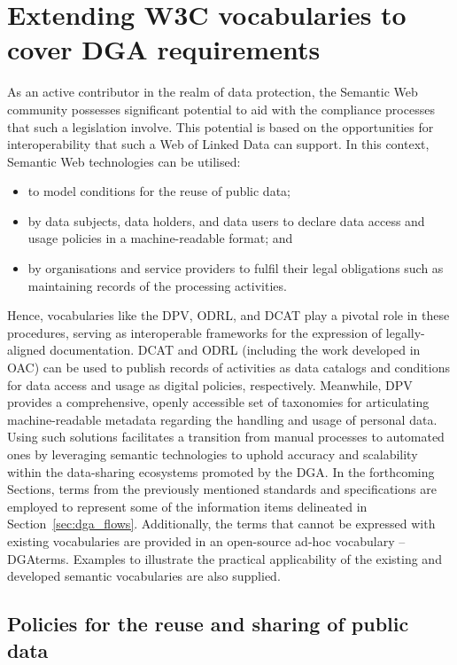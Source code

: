 \section{Extending W3C vocabularies to cover DGA requirements}
\label{sec:extending_dga}

As an active contributor in the realm of data protection, the Semantic Web community possesses significant potential to aid with the compliance processes that such a legislation involve.
This potential is based on the opportunities for interoperability that such a Web of Linked Data can support.
In this context, Semantic Web technologies can be utilised:

\begin{itemize}
    \item to model conditions for the reuse of public data;
    \item by data subjects, data holders, and data users to declare data access and usage policies in a machine-readable format; and
    \item by organisations and service providers to fulfil their legal obligations such as maintaining records of the processing activities.
\end{itemize}

Hence, vocabularies like the DPV, ODRL, and DCAT play a pivotal role in these procedures, serving as interoperable frameworks for the expression of legally-aligned documentation.
DCAT and ODRL (including the work developed in OAC) can be used to publish records of activities as data catalogs and conditions for data access and usage as digital policies, respectively.
Meanwhile, DPV provides a comprehensive, openly accessible set of taxonomies for articulating machine-readable metadata regarding the handling and usage of personal data.
Using such solutions facilitates a transition from manual processes to automated ones by leveraging semantic technologies to uphold accuracy and scalability within the data-sharing ecosystems promoted by the DGA.
In the forthcoming Sections, terms from the previously mentioned standards and specifications are employed to represent some of the information items delineated in Section~\ref{sec:dga_flows}.
Additionally, the terms that cannot be expressed with existing vocabularies are provided in an open-source ad-hoc vocabulary -- DGAterms.
Examples to illustrate the practical applicability of the existing and developed semantic vocabularies are also supplied.

\subsection{Policies for the reuse and sharing of public data}
\label{sec:dga_policies}

